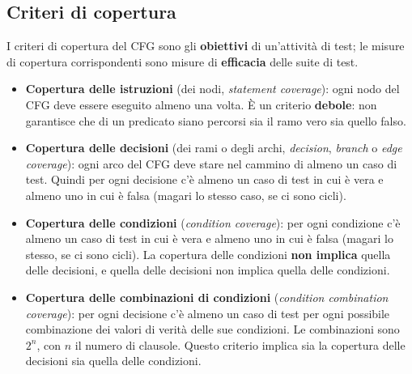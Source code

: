 \subsection{Criteri di copertura}

I criteri di copertura del CFG sono gli \textbf{obiettivi} di un'attività di test; le misure di copertura corrispondenti
sono misure di \textbf{efficacia} delle suite di test.

\begin{itemize}
  \item \textbf{Copertura delle istruzioni} (dei nodi, \textit{statement coverage}): ogni nodo del CFG deve essere
        eseguito almeno una volta. È un criterio \textbf{debole}: non garantisce che di un predicato siano percorsi sia
        il ramo vero sia quello falso.
  \item \textbf{Copertura delle decisioni} (dei rami o degli archi, \textit{decision}, \textit{branch} o \textit{edge
        coverage}): ogni arco del CFG deve stare nel cammino di almeno un caso di test. Quindi per ogni decisione c'è
        almeno un caso di test in cui è vera e almeno uno in cui è falsa (magari lo stesso caso, se ci sono cicli).
\end{itemize}


\begin{itemize}
  \item \textbf{Copertura delle condizioni} (\textit{condition coverage}): per ogni condizione c'è almeno un caso di
        test in cui è vera e almeno uno in cui è falsa (magari lo stesso, se ci sono cicli). La copertura delle
        condizioni \textbf{non implica} quella delle decisioni, e quella delle decisioni non implica quella delle
        condizioni.
  \item \textbf{Copertura delle combinazioni di condizioni} (\textit{condition combination coverage}): per ogni
        decisione c'è almeno un caso di test per ogni possibile combinazione dei valori di verità delle sue
        condizioni. Le combinazioni sono \(2^n\), con \(n\) il numero di clausole. Questo criterio implica sia la
        copertura delle decisioni sia quella delle condizioni.
\end{itemize}

